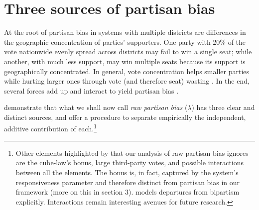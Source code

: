 \documentclass[letter,12pt]{article}
\begin{document}
\section{Three sources of partisan bias}

At the root of partisan bias in systems with multiple districts are differences in the geographic concentration of parties' supporters. One party with 20\% of the vote nationwide evenly spread across districts may fail to win a single seat;  while another, with much less support, may win multiple seats because its support is geographically concentrated. In general, vote concentration helps smaller parties while hurting larger ones through vote (and therefore seat) wasting \citep{calvo.roddenMultipartyPlurality2015}. In the end, several forces add up and interact to yield partisan bias \citep{gudgin.taylor.1980decomposeBias}. 

\citet[][, henceforth GKB]{grofman.etalBiasMalapp.1997} demonstrate that what we shall now call \emph{raw partisan bias} ($\lambda$) has three clear and distinct sources, and offer a procedure to separate empirically the independent, additive contribution of each.\footnote{Other elements highlighted by \citet{gudgin.taylor.1980decomposeBias} that our analysis of raw partisan bias ignores are the cube-law's bonus, large third-party votes, and possible interactions between all the elements. The bonus is, in fact, captured by the system's responsiveness parameter and therefore distinct from partisan bias in our framework (more on this in section 3). \citet{calvo.2009roadToPR} models departures from bipartism explicitly. Interactions remain interesting avenues for future research.} 
\end{document}
